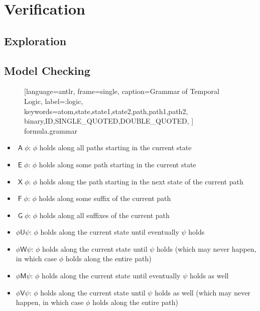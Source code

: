 \clearpage
\section{Verification}

\subsection{Exploration}

\subsection{Model Checking}

\FloatBarrier
\begin{figure}[tb]

    [language=antlr,
     frame=single,
     caption={Grammar of Temporal Logic},
     label=\lstprf:logic,
     keywords={atom,state,state1,state2,path,path1,path2,
               binary,ID,SINGLE_QUOTED,DOUBLE_QUOTED},
    ]
    {formula.grammar}
\end{figure}
\newcommand{\Aop}{\mathop{\mathsf{A}}}
\newcommand{\Eop}{\mathop{\mathsf{E}}}
\newcommand{\Xop}{\mathop{\mathsf{X}}}
\newcommand{\Fop}{\mathop{\mathsf{F}}}
\newcommand{\Gop}{\mathop{\mathsf{G}}}
\newcommand{\Uop}{\mathbin{\mathsf{U}}}
\newcommand{\Wop}{\mathbin{\mathsf{W}}}
\newcommand{\Mop}{\mathbin{\mathsf{M}}}
\newcommand{\Vop}{\mathbin{\mathsf{V}}}

\begin{itemize}
\item $\Aop \phi$: $\phi$ holds along all paths starting in the current state
\item $\Eop \phi$: $\phi$ holds along some path starting in the current state
\item $\Xop \phi$: $\phi$ holds along the path starting in the next state of
  the current path
\item $\Fop \phi$: $\phi$ holds along some suffix of the current path
\item $\Gop \phi$: $\phi$ holds along all suffixes of the current path
\item $\phi \Uop \psi$: $\phi$ holds along the current state until eventually
  $\psi$ holds
\item $\phi \Wop \psi$: $\phi$ holds along the current state until
  $\psi$ holds (which may never happen, in which case $\phi$ holds along the
  entire path)
\item $\phi \Mop \psi$: $\phi$ holds along the current state until eventually
  $\psi$ holds as well
\item $\phi \Vop \psi$: $\phi$ holds along the current state until $\psi$ holds
  as well (which may never happen, in which case $\phi$ holds along the entire
  path)
\end{itemize}
